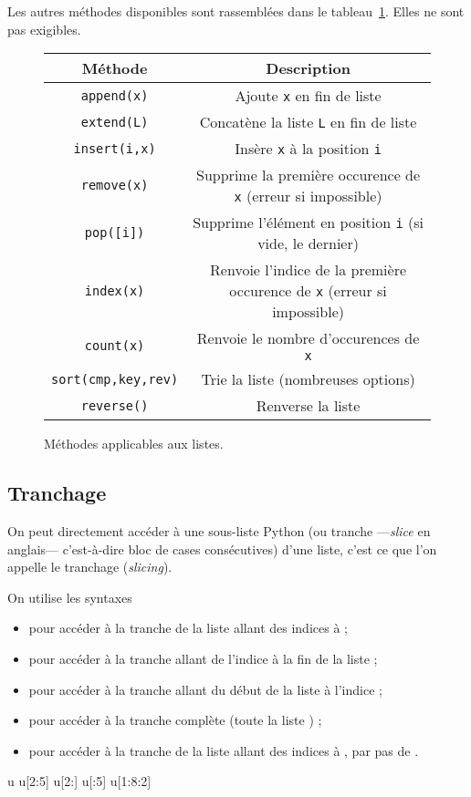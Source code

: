 Les autres méthodes disponibles sont rassemblées dans le tableau~\ref{tab.list.methodes}. Elles ne sont pas exigibles.
\begin{figure}[!h]
  \begin{center}
    \begin{tabular}{|c|c|}
      \hline 
      Méthode & Description \\
      \hline
      \texttt{append(x)} & Ajoute \texttt{x} en fin de liste \\
      \hline
      \texttt{extend(L)} & Concatène la liste \texttt{L} en fin de liste \\
      \hline
      \texttt{insert(i,x)} & Insère  \texttt{x} à la position \texttt{i} \\
      \hline
      \texttt{remove(x)} & Supprime la première occurence de \texttt{x} (erreur si impossible)\\
      \hline
      \texttt{pop([i])} & Supprime l'élément en position \texttt{i} (si vide, le dernier) \\
      \hline 
      \texttt{index(x)} & Renvoie l'indice de la première occurence de \texttt{x} (erreur si impossible)\\
      \hline
      \texttt{count(x)} & Renvoie le nombre d'occurences de \texttt{x} \\
      \hline
      \texttt{sort(cmp,key,rev)} & Trie la liste (nombreuses options) \\
      \hline
      \texttt{reverse()} & Renverse la liste \\
      \hline
    \end{tabular}
  \end{center}
  \caption{Méthodes applicables aux listes.}
  \label{tab.list.methodes}
\end{figure}
%
\subsection{Tranchage}

On peut directement accéder à une sous-liste Python (ou tranche ---\emph{slice} en anglais--- 
c'est-à-dire bloc de cases consécutives) d'une liste, c'est ce que l'on appelle le tranchage 
(\textit{slicing}).

On utilise les  syntaxes 
\begin{itemize}
  \item {} pour accéder à la tranche de la liste  allant des indices  à  ;
  \item {} pour accéder à la tranche allant de l'indice  à la fin de la liste  ;
  \item {} pour accéder à la tranche allant du début de la liste  à l'indice ;
  \item {} pour accéder à la tranche complète (toute la liste ) ;
  \item {} pour accéder à la tranche de la liste  allant des indices  à , par pas de .
\end{itemize}
\begin{pyconsole}
u
u[2:5]
u[2:]
u[:5]
u[1:8:2]
\end{pyconsole}

